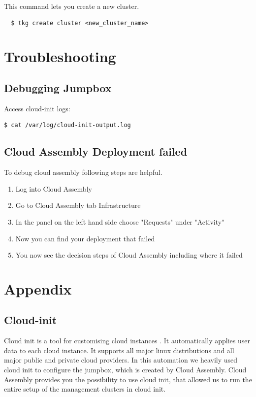 \documentclass{article}
\begin{document}
\noindent This command lets you create a new cluster.
\begin{lstlisting}
  $ tkg create cluster <new_cluster_name>
\end{lstlisting}





\section{Troubleshooting}

\subsection{Debugging Jumpbox}

Access cloud-init logs:
\begin{lstlisting}[language=bash]
  $ cat /var/log/cloud-init-output.log
\end{lstlisting}

\subsection{Cloud Assembly Deployment failed}
To debug cloud assembly following steps are helpful. 

\begin{enumerate}
  \item Log into Cloud Assembly
  \item Go to Cloud Assembly tab Infrastructure
  \item In the panel on the left hand side choose "Requests" under "Activity"
  \item Now you can find your deployment that failed
  \item You now see the decision steps of Cloud Assembly including where it failed
\end{enumerate}



\section{Appendix}

\subsection{Cloud-init}

Cloud init is a tool for customising cloud instances \citep{cloudinit}. It automatically applies user data to each cloud instance. It supports all major linux distributions and all major public and private cloud providers. In this automation we heavily used cloud init to configure the jumpbox, which is created by Cloud Assembly. Cloud Assembly provides you the possibility to use cloud init, that allowed us to run the entire setup of the management clusters in cloud init. 






\end{document}
